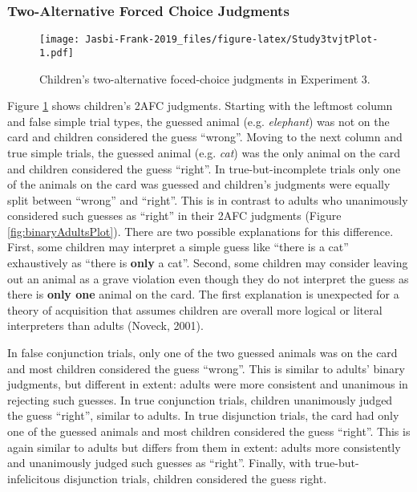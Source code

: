 \documentclass[,man,floatsintext]{apa6}
\begin{document}
\hypertarget{two-alternative-forced-choice-judgments}{%
\subsubsection{Two-Alternative Forced Choice Judgments}\label{two-alternative-forced-choice-judgments}}

\begin{figure}
\centering
\texttt{[image: Jasbi-Frank-2019\_files/figure-latex/Study3tvjtPlot-1.pdf]}
\caption{\label{fig:Study3tvjtPlot}Children's two-alternative foced-choice judgments in Experiment 3.}
\end{figure}

Figure \ref{fig:Study3tvjtPlot} shows children's 2AFC judgments. Starting with the leftmost column and false simple trial types, the guessed animal (e.g. \emph{elephant}) was not on the card and children considered the guess \enquote{wrong}. Moving to the next column and true simple trials, the guessed animal (e.g. \emph{cat}) was the only animal on the card and children considered the guess \enquote{right}. In true-but-incomplete trials only one of the animals on the card was guessed and children's judgments were equally split between \enquote{wrong} and \enquote{right}. This is in contrast to adults who unanimously considered such guesses as \enquote{right} in their 2AFC judgments (Figure \ref{fig:binaryAdultsPlot}). There are two possible explanations for this difference. First, some children may interpret a simple guess like \enquote{there is a cat} exhaustively as \enquote{there is \textbf{only} a cat}. Second, some children may consider leaving out an animal as a grave violation even though they do not interpret the guess as there is \textbf{only one} animal on the card. The first explanation is unexpected for a theory of acquisition that assumes children are overall more logical or literal interpreters than adults (Noveck, 2001).

In false conjunction trials, only one of the two guessed animals was on the card and most children considered the guess \enquote{wrong}. This is similar to adults' binary judgments, but different in extent: adults were more consistent and unanimous in rejecting such guesses. In true conjunction trials, children unanimously judged the guess \enquote{right}, similar to adults. In true disjunction trials, the card had only one of the guessed animals and most children considered the guess \enquote{right}. This is again similar to adults but differs from them in extent: adults more consistently and unanimously judged such guesses as \enquote{right}. Finally, with true-but-infelicitous disjunction trials, children considered the guess right.
\end{document}

